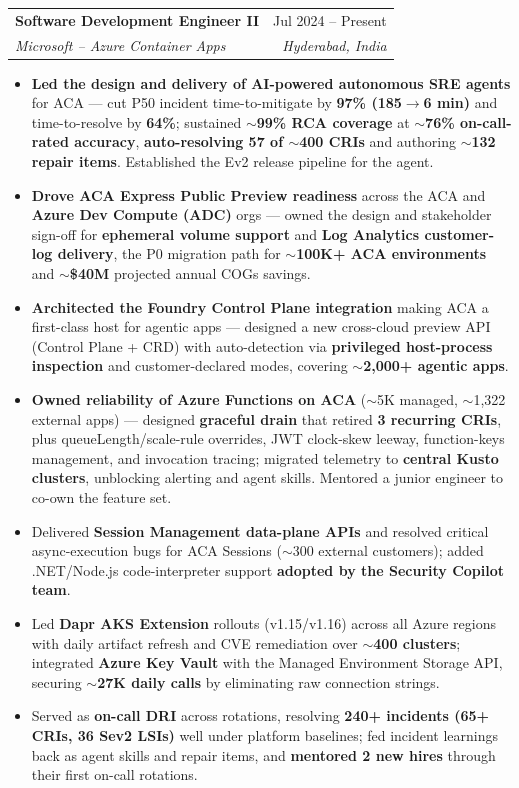 \documentclass[a4paper,9pt]{extarticle}
\makeatletter
\newcommand{\resumeSubheading}[4]{
  \vspace{-2pt}\item
    \begin{tabular*}{0.97\textwidth}[t]{l@{\extracolsep{\fill}}r}
      \textbf{#1} & #2 \\
      \textit{\small #3} & \textit{\small #4} \\
    \end{tabular*}\vspace{-6pt}
}
\newcommand{\resumeItemPlain}[1]{
  \item\small{#1 \vspace{-3pt}}
}
\newcommand{\resumeItemListStart}{\begin{itemize}}
\newcommand{\resumeItemListEnd}{\end{itemize}\vspace{-6pt}}
\makeatother
\begin{document}
    \resumeSubheading
      {Software Development Engineer II}{Jul 2024 -- Present}
      {Microsoft -- Azure Container Apps}{Hyderabad, India}
      \resumeItemListStart
        \resumeItemPlain{\textbf{Led the design and delivery of AI-powered autonomous SRE agents} for ACA --- cut P50 incident time-to-mitigate by \textbf{97\% (185$\rightarrow$6 min)} and time-to-resolve by \textbf{64\%}; sustained \textbf{$\sim$99\% RCA coverage} at \textbf{$\sim$76\% on-call-rated accuracy}, \textbf{auto-resolving 57 of $\sim$400 CRIs} and authoring \textbf{$\sim$132 repair items}. Established the Ev2 release pipeline for the agent.}
        \resumeItemPlain{\textbf{Drove ACA Express Public Preview readiness} across the ACA and \textbf{Azure Dev Compute (ADC)} orgs --- owned the design and stakeholder sign-off for \textbf{ephemeral volume support} and \textbf{Log Analytics customer-log delivery}, the P0 migration path for \textbf{$\sim$100K+ ACA environments} and \textbf{$\sim$\$40M} projected annual COGs savings.}
        \resumeItemPlain{\textbf{Architected the Foundry Control Plane integration} making ACA a first-class host for agentic apps --- designed a new cross-cloud preview API (Control Plane + CRD) with auto-detection via \textbf{privileged host-process inspection} and customer-declared modes, covering \textbf{$\sim$2,000+ agentic apps}.}
        \resumeItemPlain{\textbf{Owned reliability of Azure Functions on ACA} ($\sim$5K managed, $\sim$1,322 external apps) --- designed \textbf{graceful drain} that retired \textbf{3 recurring CRIs}, plus queueLength/scale-rule overrides, JWT clock-skew leeway, function-keys management, and invocation tracing; migrated telemetry to \textbf{central Kusto clusters}, unblocking alerting and agent skills. Mentored a junior engineer to co-own the feature set.}
        \resumeItemPlain{Delivered \textbf{Session Management data-plane APIs} and resolved critical async-execution bugs for ACA Sessions ($\sim$300 external customers); added .NET/Node.js code-interpreter support \textbf{adopted by the Security Copilot team}.}
        \resumeItemPlain{Led \textbf{Dapr AKS Extension} rollouts (v1.15/v1.16) across all Azure regions with daily artifact refresh and CVE remediation over \textbf{$\sim$400 clusters}; integrated \textbf{Azure Key Vault} with the Managed Environment Storage API, securing \textbf{$\sim$27K daily calls} by eliminating raw connection strings.}
        \resumeItemPlain{Served as \textbf{on-call DRI} across rotations, resolving \textbf{240+ incidents (65+ CRIs, 36 Sev2 LSIs)} well under platform baselines; fed incident learnings back as agent skills and repair items, and \textbf{mentored 2 new hires} through their first on-call rotations.}
      \resumeItemListEnd
\end{document}
